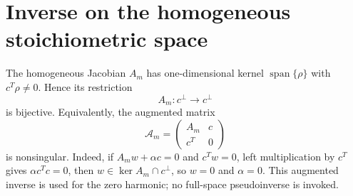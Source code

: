 \section*{Inverse on the homogeneous stoichiometric space}
The homogeneous Jacobian $A_m$ has one-dimensional kernel
$\operatorname{span}\{\rho\}$ with $c^T\rho\neq0$.  Hence its restriction
\[
A_m:c^\perp\longrightarrow c^\perp
\]
is bijective.  Equivalently, the augmented matrix
\[
\mathcal A_m=\begin{pmatrix}A_m&c\\c^T&0\end{pmatrix}
\]
is nonsingular.  Indeed, if $A_mw+\alpha c=0$ and $c^Tw=0$, left
multiplication by $c^T$ gives $\alpha c^Tc=0$, then $w\in\ker A_m\cap c^\perp$,
so $w=0$ and $\alpha=0$.  This augmented inverse is used for the zero harmonic;
no full-space pseudoinverse is invoked.
